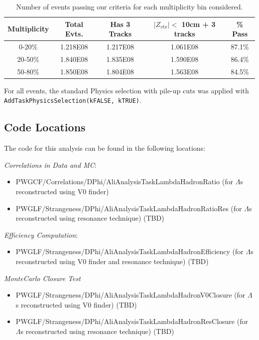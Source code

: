 \documentclass[ALICE,manyauthors]{ALICE_analysis_notes}
\begin{document}
\begin{table}[h!]
    \centering
\begin{tabular}{| c | c | c | c || c | }
\hline
Multiplicity & Total Evts. & Has 3 Tracks & $|Z_{vtx}| <$  10cm + 3 tracks & \% Pass \\
\hline
0-20\% & 1.218E08 & 1.217E08 & 1.061E08 & 87.1\%\\
20-50\% & 1.840E08 & 1.835E08 & 1.590E08 & 86.4\%\\
50-80\% & 1.850E08 & 1.804E08 & 1.563E08 & 84.5\%\\
\hline
\end{tabular}
\caption{Number of events passing our criteria for each multiplicity bin considered.}
\label{event_table}
\end{table}

For all events, the standard Physics selection with pile-up cuts was applied with \texttt{AddTaskPhysicsSelection(kFALSE, kTRUE)}.

\subsection{Code Locations}
The code for this analysis can be found in the following locations:

\textit{Correlations in Data and MC}:
\begin{itemize}
\item  PWGCF/Correlations/DPhi/AliAnalysisTaskLambdaHadronRatio (for $\Lambda$s reconstructed using V0 finder)
\item  PWGLF/Strangeness/DPhi/AliAnalysisTaskLambdaHadronRatioRes (for $\Lambda$s reconstructed using resonance technique) (TBD)
\end{itemize}

\textit{Efficiency Computation}:
\begin{itemize}
\item  PWGLF/Strangeness/DPhi/AliAnalysisTaskLambdaHadronEfficiency (for $\Lambda$s reconstructed using V0 finder and resonance technique) (TBD)
\end{itemize}

\textit{MonteCarlo Closure Test}
\begin{itemize}
\item  PWGLF/Strangeness/DPhi/AliAnalysisTaskLambdaHadronV0Closure (for $\Lambda$s reconstructed using V0 finder) (TBD)
\item  PWGLF/Strangeness/DPhi/AliAnalysisTaskLambdaHadronResClosure (for $\Lambda$s reconstructed using resonance technique) (TBD)
\end{itemize}
\end{document}
